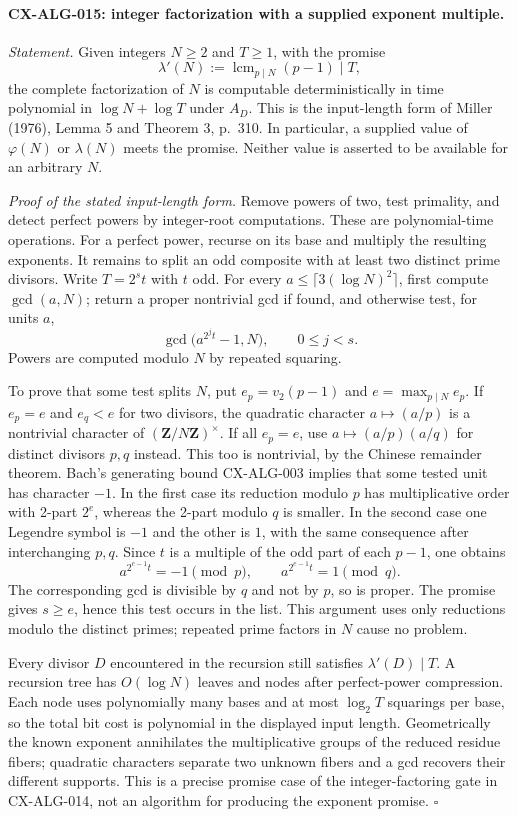 \documentclass[11pt,a4paper]{article}
\begin{document}
\paragraph{CX-ALG-015: integer factorization with a supplied exponent multiple.}
\emph{Statement.} Given integers $N\ge2$ and $T\ge1$, with the promise
\[
       \lambda'(N):=\operatorname{lcm}_{p\mid N}(p-1)\mid T,
\]
the complete factorization of $N$ is computable deterministically in time
polynomial in $\log N+\log T$ under $A_D$. This is the input-length form
of Miller (1976), Lemma 5 and Theorem 3, p.~310. In particular, a supplied
value of $\varphi(N)$ or $\lambda(N)$ meets the promise. Neither value is
asserted to be available for an arbitrary $N$.

\emph{Proof of the stated input-length form.} Remove powers of two, test
primality, and detect perfect powers by integer-root computations. These
are polynomial-time operations. For a perfect power, recurse on its base
and multiply the resulting exponents. It remains to split an odd composite
with at least two distinct prime divisors. Write $T=2^s t$ with $t$ odd.
For every $a\leq\lceil3(\log N)^2\rceil$, first compute $\gcd(a,N)$;
return a proper nontrivial gcd if found, and otherwise test, for units $a$,
\[
             \gcd\bigl(a^{2^j t}-1,N\bigr),\qquad 0\leq j<s.
\]
Powers are computed modulo $N$ by repeated squaring.

To prove that some test splits $N$, put
$e_p=v_2(p-1)$ and $e=\max_{p\mid N}e_p$. If $e_p=e$ and $e_q<e$ for
two divisors, the quadratic character $a\mapsto(a/p)$ is a nontrivial
character of $(\mathbf Z/N\mathbf Z)^\times$. If all $e_p=e$, use
$a\mapsto(a/p)(a/q)$ for distinct divisors $p,q$ instead. This too is
nontrivial, by the Chinese remainder theorem. Bach's generating bound
CX-ALG-003 implies that some tested unit has character $-1$.
In the first case its reduction modulo $p$ has multiplicative order with
2-part $2^e$, whereas the 2-part modulo $q$ is smaller. In the second
case one Legendre symbol is $-1$ and the other is $1$, with the same
consequence after interchanging $p,q$. Since $t$ is a multiple of the odd
part of each $p-1$, one obtains
\[
       a^{2^{e-1}t}=-1\pmod p,\qquad
       a^{2^{e-1}t}=1\pmod q.
\]
The corresponding gcd is divisible by $q$ and not by $p$, so is proper.
The promise gives $s\ge e$, hence this test occurs in the list. This
argument uses only reductions modulo the distinct primes; repeated prime
factors in $N$ cause no problem.

Every divisor $D$ encountered in the recursion still satisfies
$\lambda'(D)\mid T$. A recursion tree has $O(\log N)$ leaves and nodes
after perfect-power compression. Each node uses polynomially many bases
and at most $\log_2T$ squarings per base, so the total bit cost is
polynomial in the displayed input length. Geometrically the known exponent
annihilates the multiplicative groups of the reduced residue fibers;
quadratic characters separate two unknown fibers and a gcd recovers their
different supports. This is a precise promise case of the integer-factoring
gate in CX-ALG-014, not an algorithm for producing the exponent promise.
\hfill$\square$
\end{document}
